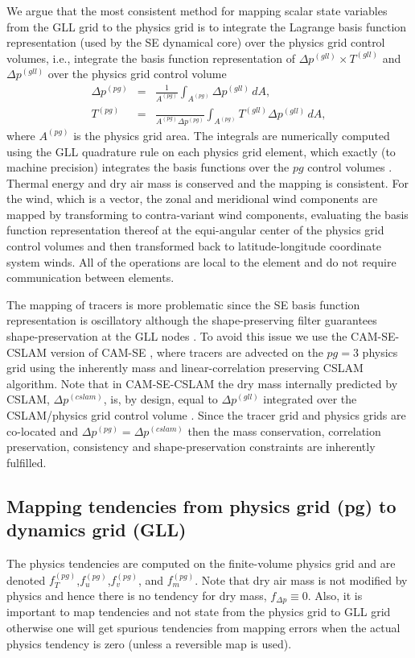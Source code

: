 \documentclass{ametsoc}
\begin{document}
We argue that the most consistent method for mapping scalar state variables from the GLL grid to the physics grid is to integrate the Lagrange basis function representation (used by the SE dynamical core) over the physics grid control volumes, i.e., integrate the basis function representation of $\Delta p^{(gll)}\times T^{(gll)}$ and $\Delta p^{(gll)}$ over the physics grid control volume \citep[see, e.g., ][]{LTOUNGK2017MWR,UT2015MWR}
\begin{eqnarray}
\Delta p^{(pg)}&=&\frac{1}{A^{(pg)}}\int_{A^{(pg)}}\Delta p^{(gll)}\, dA,\\
T^{(pg)}&=&\frac{}{A^{(pg)}\Delta p^{(pg)}}\int_{A^{(pg)}}T^{(gll)}\Delta p^{(gll)}\, dA,
\end{eqnarray}
where $A^{(pg)}$ is the physics grid area. The integrals are numerically computed using the GLL quadrature rule on each physics grid element, which exactly (to machine precision) integrates the basis functions over the $pg$ control volumes \citep{LTOUNGK2017MWR}. Thermal energy and dry air mass is conserved and the mapping is consistent. For the wind, which is a vector, the zonal and meridional wind components are mapped by transforming to contra-variant wind components, evaluating the basis function representation thereof at the equi-angular center of the physics grid control volumes and then transformed back to latitude-longitude coordinate system winds. All of the operations are local to the element and do not require communication between elements.

The mapping of tracers is more problematic since the SE basis function representation is oscillatory although the shape-preserving filter guarantees shape-preservation at the GLL nodes \citep{GTS2014JCP}. To avoid this issue we use the CAM-SE-CSLAM version of CAM-SE \citep[Conservative Semi-Lagrangian Multi-tracer transport scheme][]{LTOUNGK2017MWR}, where tracers are advected on the $pg=3$ physics grid using the inherently mass and linear-correlation preserving CSLAM algorithm. Note that in CAM-SE-CSLAM the dry mass internally predicted by CSLAM, $\Delta p^{(cslam)}$, is, by design, equal to $\Delta p^{(gll)}$ integrated over the CSLAM/physics grid control volume \citep{LTOUNGK2017MWR}. Since the tracer grid and physics grids are co-located and $\Delta p^{(pg)}=\Delta p^{(cslam)}$ then the  mass conservation, correlation preservation, consistency and shape-preservation constraints are inherently fulfilled.
%
\subsection{Mapping tendencies from physics grid (pg) to dynamics grid (GLL)}
The physics tendencies are computed on the finite-volume physics grid and are denoted $f_T^{(pg)}$,$f_u^{(pg)}$,$f_v^{(pg)}$, and $f_m^{(pg)}$. Note that dry air mass is not modified by physics and hence there is no tendency for dry mass,  $f_{\Delta p}\equiv 0$. Also, it is important to map tendencies and not state from the physics grid to GLL grid otherwise one will get spurious tendencies from mapping errors when the actual physics tendency is zero (unless a reversible map is used).
\end{document}
